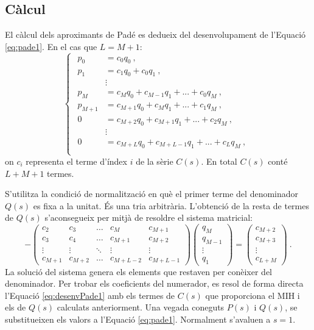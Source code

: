 \subsection{Càlcul}
El càlcul dels aproximants de Padé es dedueix del desenvolupament de l'Equació \ref{eq:pade1}. En el cas que $L=M+1$:
\begin{equation}
    \begin{cases}
    \begin{split}
        p_0 &= c_0q_0\ ,\\
        p_1 &= c_1q_0 + c_0q_1\ ,\\
        &\vdots\\
        p_M&=c_Mq_0+c_{M-1}q_1+...+c_0q_M\ ,\\
        p_{M+1}&=c_{M+1}q_0+c_Mq_1+...+c_1q_M\ ,\\
        0&=c_{M+2}q_0+c_{M+1}q_1+...+c_2q_M\ ,\\
        &\vdots\\
        0&=c_{M+L}q_0+c_{M+L-1}q_1+...+c_Lq_M\ ,\\
    \end{split}
\end{cases}
    \label{eq:desenvPade1}
\end{equation}
on $c_i$ representa el terme d'índex $i$ de la sèrie $C(s)$. En total $C(s)$ conté $L+M+1$ termes. 

S'utilitza la condició de normalització en què el primer terme del denominador $Q(s)$ es fixa a la unitat. És una tria arbitrària. L'obtenció de la resta de termes de $Q(s)$ s'aconsegueix per mitjà de resoldre el sistema matricial:
\begin{equation}
   -\begin{pmatrix}
        c_{2} & c_3 & \dots & c_M & c_{M+1}\\
        c_{3} & c_{4} & \dots & c_{M+1} & c_{M+2}\\
        \vdots & \vdots & \ddots & \vdots & \vdots\\
        c_{M+1} & c_{M+2} & \dots & c_{M+L-2} & c_{M+L-1}
    \end{pmatrix}
    \begin{pmatrix}
        q_M\\
        q_{M-1}\\
        \vdots\\
        q_1
    \end{pmatrix}
    =
    \begin{pmatrix}
        c_{M+2}\\
        c_{M+3}\\
        \vdots\\
        c_{L+M}
    \end{pmatrix}\ .
    \label{eq:desenvPade2}
\end{equation}
La solució del sistema genera els elements que restaven per conèixer del denominador. Per trobar els coeficients del numerador, es resol de forma directa l'Equació \ref{eq:desenvPade1} amb els termes de $C(s)$ que proporciona el MIH i els de $Q(s)$ calculats anteriorment. Una vegada coneguts $P(s)$ i $Q(s)$, se substitueixen els valors a l'Equació \ref{eq:pade1}. Normalment s'avaluen a $s=1$. 

